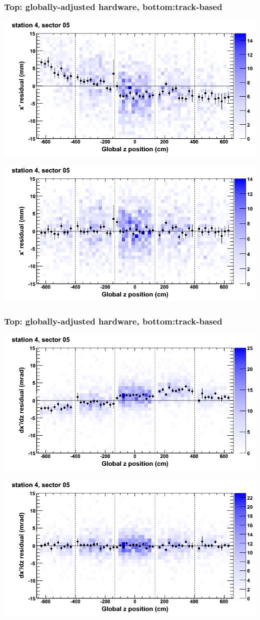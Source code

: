 \documentclass[compress]{beamer}
\begin{document}
\begin{frame}
\frametitle{Top: globally-adjusted hardware, bottom:track-based}
\includegraphics[width=0.7\linewidth]{NOV4_mapplots_HW/DTvsz_st4sec05_x.png}

\includegraphics[width=0.7\linewidth]{NOV4_mapplots/DTvsz_st4sec05_x.png}
\end{frame}

\begin{frame}
\frametitle{Top: globally-adjusted hardware, bottom:track-based}
\includegraphics[width=0.7\linewidth]{NOV4_mapplots_HW/DTvsz_st4sec05_dxdz.png}

\includegraphics[width=0.7\linewidth]{NOV4_mapplots/DTvsz_st4sec05_dxdz.png}
\end{frame}
\end{document}
